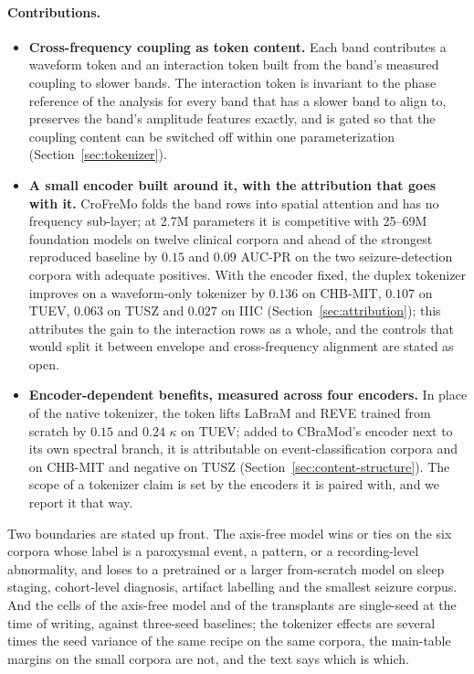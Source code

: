 \paragraph{Contributions.}
\begin{itemize}[leftmargin=*,itemsep=2pt,topsep=2pt]
\item \textbf{Cross-frequency coupling as token content.} Each band
  contributes a waveform token and an interaction token built from the
  band's measured coupling to slower bands. The interaction token is
  invariant to the phase reference of the analysis for every band that has
  a slower band to align to, preserves the band's amplitude features
  exactly, and is gated so that the coupling content can be switched off
  within one parameterization (Section~\ref{sec:tokenizer}).
\item \textbf{A small encoder built around it, with the attribution that
  goes with it.} CroFreMo folds the band rows into spatial attention and
  has no frequency sub-layer; at 2.7M parameters it is competitive with
  25--69M foundation models on twelve clinical corpora and ahead of the
  strongest reproduced baseline by $0.15$ and $0.09$ AUC-PR on the two
  seizure-detection corpora with adequate positives. With the encoder
  fixed, the duplex tokenizer improves on a waveform-only tokenizer by
  $0.136$ on CHB-MIT, $0.107$ on TUEV, $0.063$ on TUSZ and $0.027$ on IIIC
  (Section~\ref{sec:attribution}); this attributes the gain to the
  interaction rows as a whole, and the controls that would split it
  between envelope and cross-frequency alignment are stated as open.
\item \textbf{Encoder-dependent benefits, measured across four
  encoders.} In place of the native tokenizer, the token lifts LaBraM and
  REVE trained from scratch by $0.15$ and $0.24$ $\kappa$ on TUEV; added to
  CBraMod's encoder next to its own spectral branch, it is attributable on
  event-classification corpora and on CHB-MIT and negative on TUSZ
  (Section~\ref{sec:content-structure}). The scope of a tokenizer claim is
  set by the encoders it is paired with, and we report it that way.
\end{itemize}

Two boundaries are stated up front. The axis-free model wins or ties on
the six corpora whose label is a paroxysmal event, a pattern, or a
recording-level abnormality, and loses to a pretrained or a larger
from-scratch model on sleep staging, cohort-level diagnosis, artifact
labelling and the smallest seizure corpus. And the cells of the axis-free
model and of the transplants are single-seed at the time of writing,
against three-seed baselines; the tokenizer effects are several times the
seed variance of the same recipe on the same corpora, the main-table
margins on the small corpora are not, and the text says which is which.
